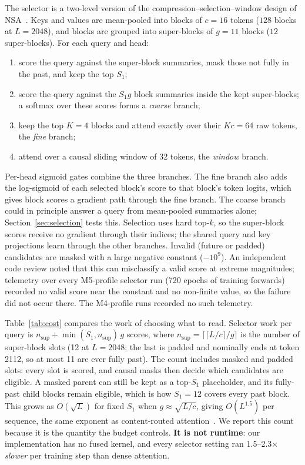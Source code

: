The selector is a two-level version of the compression--selection--window design of NSA~\cite{yuan2025nsa}. Keys and
values are mean-pooled into blocks of $c{=}16$ tokens ($128$ blocks at $L{=}2048$), and blocks are grouped into
super-blocks of $g{=}11$ blocks ($12$ super-blocks). For each query and head:
\begin{enumerate}
\item score the query against the super-block summaries, mask those not fully in the past, and keep the top $S_1$;
\item score the query against the $S_1 g$ block summaries inside the kept super-blocks; a softmax over these scores
forms a \emph{coarse} branch;
\item keep the top $K{=}4$ blocks and attend exactly over their $Kc{=}64$ raw tokens, the \emph{fine} branch;
\item attend over a causal sliding window of 32 tokens, the \emph{window} branch.
\end{enumerate}
Per-head sigmoid gates combine the three branches. The fine branch also adds the log-sigmoid of each selected block's
score to that block's token logits, which gives block scores a gradient path through the fine branch. The coarse
branch could in principle answer a query from mean-pooled summaries alone; Section~\ref{sec:selection} tests this. Selection uses hard top-$k$, so the super-block scores receive no
gradient through their indices; the shared query and key projections learn through the other branches. Invalid
(future or padded) candidates are masked with a large negative constant ($-10^9$). An independent code review noted
that this can misclassify a valid score at extreme magnitudes; telemetry over every M5-profile selector run (720
epochs of training forwards) recorded no valid score near the constant and no non-finite value, so the failure did
not occur there. The M4-profile runs recorded no such telemetry.

Table~\ref{tab:cost} compares the work of choosing what to read. Selector work per query is
$n_{\text{sup}} + \min(S_1, n_{\text{sup}})\,g$ scores, where $n_{\text{sup}} = \lceil \lceil L/c \rceil / g \rceil$
is the number of super-block slots (12 at $L{=}2048$; the last is padded and nominally ends at token 2112, so at most
11 are ever fully past). The count includes masked and padded slots: every slot is scored, and causal masks then
decide which candidates are eligible. A masked parent can still be kept as a top-$S_1$ placeholder, and its fully-past
child blocks remain eligible, which is how $S_1{=}12$ covers every past block. This grows as $O(\sqrt{L})$ for fixed $S_1$ when
$g \approx \sqrt{L/c}$, giving $O(L^{1.5})$ per sequence, the same exponent as content-routed
attention~\cite{roy2021routing}. We report this count because it is the quantity the budget controls. \textbf{It
is not runtime}: our implementation has no fused kernel, and every selector setting ran 1.5--2.3$\times$
\emph{slower} per training step than dense attention.

